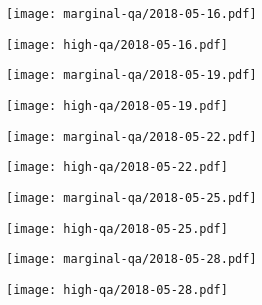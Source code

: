 \documentclass{article}
\begin{document}
\begin{figure}[H]
	\ContinuedFloat
	\centering
	\begin{subfigure}{0.48\linewidth}
		\texttt{[image: marginal-qa/2018-05-16.pdf]}
	\end{subfigure}
	\begin{subfigure}{0.48\linewidth}
		\texttt{[image: high-qa/2018-05-16.pdf]}
	\end{subfigure}
	\begin{subfigure}{0.48\linewidth}
		\texttt{[image: marginal-qa/2018-05-19.pdf]}
	\end{subfigure}
	\begin{subfigure}{0.48\linewidth}
		\texttt{[image: high-qa/2018-05-19.pdf]}
	\end{subfigure}
	\begin{subfigure}{0.48\linewidth}
		\texttt{[image: marginal-qa/2018-05-22.pdf]}
	\end{subfigure}
	\begin{subfigure}{0.48\linewidth}
		\texttt{[image: high-qa/2018-05-22.pdf]}
	\end{subfigure}
	\begin{subfigure}{0.48\linewidth}
		\texttt{[image: marginal-qa/2018-05-25.pdf]}
	\end{subfigure}
	\begin{subfigure}{0.48\linewidth}
		\texttt{[image: high-qa/2018-05-25.pdf]}
	\end{subfigure}
	\begin{subfigure}{0.48\linewidth}
		\texttt{[image: marginal-qa/2018-05-28.pdf]}
	\end{subfigure}
	\begin{subfigure}{0.48\linewidth}
		\texttt{[image: high-qa/2018-05-28.pdf]}
	\end{subfigure}
\end{figure}
\end{document}
